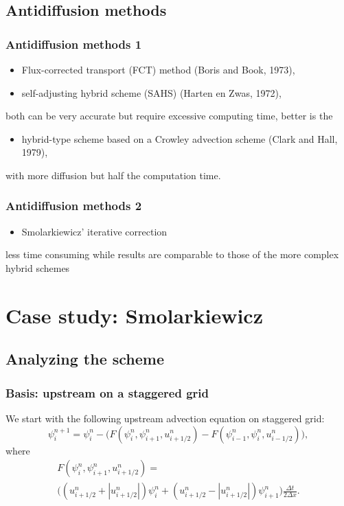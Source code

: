 \documentclass[hyperref={pdfstartview=Fit}]{beamer}
\providecommand{\abs}[1]{\left\lvert#1\right\rvert}
\begin{document}
\subsection{Antidiffusion methods}

\begin{frame}
\frametitle{Antidiffusion methods 1}
\begin{itemize}
\item Flux-corrected transport (FCT) method (Boris and Book, 1973),
\item self-adjusting hybrid scheme (SAHS) (Harten en Zwas, 1972),
\end{itemize}
   both can be very accurate but require excessive computing time, better is the
\begin{itemize}
   \item hybrid-type scheme based on a Crowley advection scheme (Clark and Hall, 1979),
\end{itemize}
   with more diffusion but half the computation time.
\end{frame}

\begin{frame}
\frametitle{Antidiffusion methods 2}
\begin{itemize}
\item Smolarkiewicz' iterative correction
\end{itemize}
   less time consuming while results are comparable to those of the more complex hybrid schemes
\end{frame}

\section{Case study: Smolarkiewicz}
\subsection{Analyzing the scheme}

\begin{frame}
\frametitle{Basis: upstream on a staggered grid}
We start with the following upstream advection equation on staggered grid:
\begin{equation*}
 \psi_i^{n+1} = \psi_i^n - \Big( F \left( \psi_i^n,\psi_{i+1}^n,u_{i+1/2}^n\right)
-F \left( \psi_{i-1}^n,\psi_{i}^n,u_{i-1/2}^n\right) \Big),
\end{equation*}
where
\begin{multline*}
F \left( \psi_i^n,\psi_{i+1}^n,u_{i+1/2}^n\right) =\\
\Big( \left( u_{i+1/2}^n + \abs{u_{i+1/2}^n} \right) \psi_i^n
+ \left( u_{i+1/2}^n - \abs{u_{i+1/2}^n} \right) \psi_{i+1}^n \Big)
\frac{\Delta t}{2 \Delta x}.
\end{multline*}
\end{frame}
\end{document}
